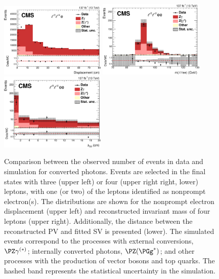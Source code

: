 \begin{figure}[h!]
    \centering
    \includegraphics[width=0.45\textwidth]{Figures/paper/convDisplacement-crop.pdf}
    \includegraphics[width=0.45\textwidth]{Figures/paper/convM4l-crop.pdf} \\
    \includegraphics[width=0.45\textwidth]{Figures/paper/convPVSV4l-crop.pdf}
    \caption{\label{fig:convdispl}
        Comparison between the observed number of events in data and
        simulation for converted photons.
        Events are selected in the final states with three (upper left) or
        four (upper right right, lower) leptons,
        with one (or two) of the leptons identified as nonprompt
        electron(s). The distributions are shown for the nonprompt electron displacement
        (upper left) and reconstructed invariant mass of four leptons (upper
        right). Additionally, the
        distance between the reconstructed PV and fitted
        SV is presented (lower).
        The simulated events correspond to the processes with external
        conversions, $\PZ\gamma^{(\ast)}$; internally converted photons,
        $\PZ(\PGg^{\ast})$; and other processes
        with the production of vector bosons and top quarks.
	The hashed band represents the statistical uncertainty
	in the simulation. \kirill}
\end{figure}



